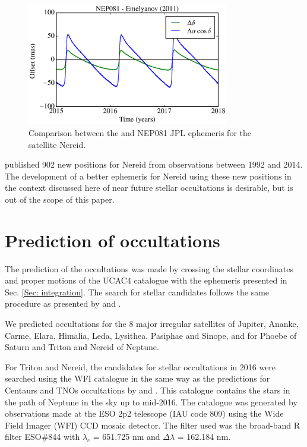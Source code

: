 \documentclass[useAMS,usenatbib]{mn2e}
\begin{document}
\begin{figure}
\begin{centering}
\includegraphics[width=8.8cm]{figures/JPL-EME_Nereid.eps}
\caption{Comparison between the \protect\cite{Emelyanov2011} and NEP081 JPL \protect\citep{Jacobson2009} ephemeris for the satellite Nereid.}
\label{Fig:eph-Nereid}
\end{centering}
\end{figure}

\cite{GomesJunior2015} published 902 new positions for Nereid from observations between 1992 and 2014. The development of a better ephemeris for Nereid using these new positions in the context discussed here of near future stellar occultations is desirable, but is out of the scope of this paper.  

\section{Prediction of occultations} \label{Sec: predictions}

The prediction of the occultations was made by crossing the stellar coordinates and proper motions of the UCAC4 catalogue \citep{Zacharias2013} with the ephemeris presented in Sec. \ref{Sec: integration}. The search for stellar candidates follows the same procedure as presented by \cite{Assafin2010, Assafin2012} and \cite{Camargo2014}.

We predicted occultations for the 8 major irregular satellites of Jupiter,  Ananke, Carme, Elara, Himalia, Leda, Lysithea, Pasiphae and Sinope, and for Phoebe of Saturn and Triton and Nereid of Neptune.

For Triton and Nereid, the candidates for stellar occultations in 2016 were searched using the WFI catalogue in the same way as the predictions for Centaurs and TNOs occultations by \cite{Assafin2010, Assafin2012} and \cite{Camargo2014}. This catalogue contains the stars in the path of Neptune in the sky up to mid-2016. The catalogue was generated by observations made at the ESO 2p2 telescope (IAU code 809) using the Wide Field Imager (WFI) CCD mosaic detector. The filter used was the broad-band R filter ESO\#844 with $\lambda_c$ = 651.725 nm and $\Delta\lambda$ = 162.184 nm.
\end{document}
